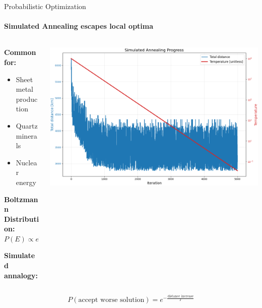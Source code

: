 \documentclass{beamer}
\begin{document}
\begin{frame}{Probabilistic Optimization}
  \framesubtitle{Simulated Annealing escapes local optima}

  \begin{columns}[c]
    \begin{column}{0.4\textwidth}
      \textbf{Common for:}

      \begin{itemize}
        \item Sheet metal production
        \item Quartz minerals
        \item Nuclear energy
      \end{itemize}

      \vspace{0.5cm}

      \textbf{Boltzmann Distribution:}
      $$P(E) \propto e^{-\frac{E}{k_B T}}$$

      \textbf{Simulated annalogy:}
    \end{column}
    \begin{column}{0.6\textwidth}
      \includegraphics[width=\textwidth]{images/annealing-history.png}
    \end{column}
  \end{columns}

  \vspace{0.5cm}

  $$P(\text{accept worse solution}) = e^{-\frac{\text{distance increase}}{T}}$$
\end{frame}
\end{document}
